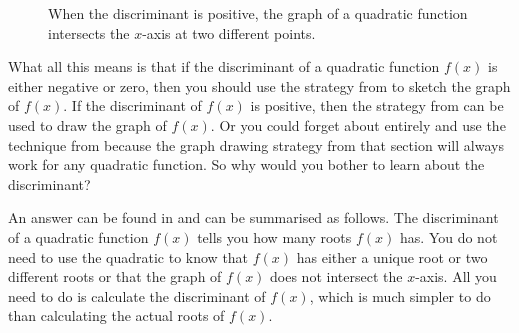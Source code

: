 \documentclass[a4paper,oneside,12pt]{article}
\begin{document}
\begin{figure}[!htbp]
\centering
{}
\qquad
\caption{%
  When the discriminant is positive, the graph of a quadratic function
  intersects the $x$-axis at two different points.
}
\label{fig:positive_discriminant}
\end{figure}

What all this means is that if the discriminant of a quadratic
function $f(x)$ is either negative or zero, then you should use the
strategy from  to sketch the graph of
$f(x)$.  If the discriminant of $f(x)$ is positive, then the strategy
from  can be used to draw the graph of
$f(x)$.  Or you could forget about 
entirely and use the technique from  because
the graph drawing strategy from that section will always work for any
quadratic function.  So why would you bother to learn about the
discriminant?

An answer can be found in
 and can
be summarised as follows.  The discriminant of a quadratic function
$f(x)$ tells you how many roots $f(x)$ has.  You do not need to use
the quadratic  to know that $f(x)$ has
either a unique root or two different roots or that the graph of
$f(x)$ does not intersect the $x$-axis.  All you need to do is
calculate the discriminant of $f(x)$, which is much simpler to do than
calculating the actual roots of $f(x)$.
\end{document}
